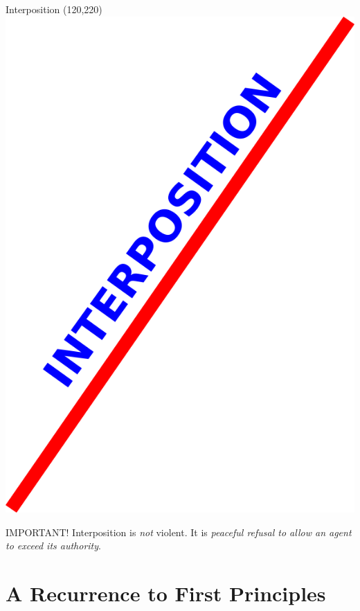 \begin{frame}{Interposition}
    \Put(120,220){\includegraphics[height=0.8\textheight]{img/line.png}}
\end{frame}

\begin{frame}
    \begin{block}{IMPORTANT!}
        { \huge Interposition is \emph{not} violent. It is \emph{peaceful refusal to allow an agent to exceed its authority}.}
    \end{block}
\end{frame}

\section{A Recurrence to First Principles}

